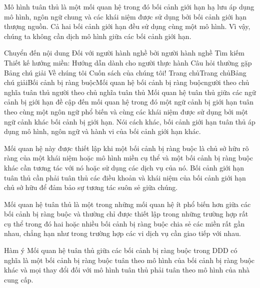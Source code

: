 

Mô hình tuân thủ là một mối quan hệ trong đó bối cảnh giới hạn hạ lưu áp dụng mô hình, ngôn ngữ chung và các khái niệm được sử dụng bởi bối cảnh giới hạn thượng nguồn.
Cả hai bối cảnh giới hạn đều sử dụng cùng một mô hình. Vì vậy, chúng ta không cần dịch mô hình giữa các bối cảnh giới hạn.


Chuyển đến nội dung
Đối với người hành nghề bởi người hành nghề
Tìm kiếm
Thiết kế hướng miền: Hướng dẫn dành cho người thực hành
Câu hỏi thường gặp
Bảng chú giải
Về chúng tôi
Cuốn sách của chúng tôi!
Trang chủTrang chủBảng chú giảiBối cảnh bị ràng buộcMối quan hệ bối cảnh bị ràng buộcngười theo chủ nghĩa tuân thủ
người theo chủ nghĩa tuân thủ
Mối quan hệ tuân thủ giữa các ngữ cảnh bị giới hạn đề cập đến mối quan hệ trong đó một ngữ cảnh bị giới hạn tuân theo cùng một ngôn ngữ phổ biến và cùng các khái niệm được sử dụng bởi một ngữ cảnh khác bối cảnh bị giới hạn. Nói cách khác, bối cảnh giới hạn tuân thủ áp dụng mô hình, ngôn ngữ và hành vi của bối cảnh giới hạn khác.

Mối quan hệ này được thiết lập khi một bối cảnh bị ràng buộc là chủ sở hữu rõ ràng của một khái niệm hoặc mô hình miền cụ thể và một bối cảnh bị ràng buộc khác cần tương tác với nó hoặc sử dụng các dịch vụ của nó. Bối cảnh giới hạn tuân thủ cần phải tuân thủ các điều khoản và khái niệm của bối cảnh giới hạn chủ sở hữu để đảm bảo sự tương tác suôn sẻ giữa chúng.

Mối quan hệ tuân thủ là một trong những mối quan hệ ít phổ biến hơn giữa các bối cảnh bị ràng buộc và thường chỉ được thiết lập trong những trường hợp rất cụ thể trong đó hai hoặc nhiều bối cảnh bị ràng buộc chia sẻ các miền rất gần nhau, chẳng hạn như trong trường hợp các vi dịch vụ cần giao tiếp với nhau.

Hàm ý
Mối quan hệ tuân thủ giữa các bối cảnh bị ràng buộc trong DDD có nghĩa là một bối cảnh bị ràng buộc tuân theo mô hình của bối cảnh bị ràng buộc khác và mọi thay đổi đối với mô hình tuân thủ phải tuân theo mô hình của nhà cung cấp.

